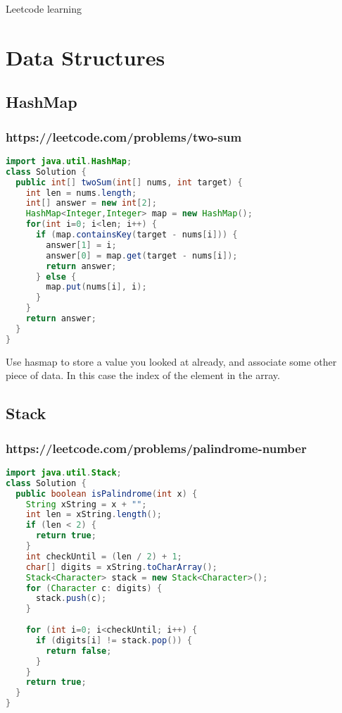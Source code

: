\documentclass[12pt]{article}
\begin{document}

\begin{center}
    \Large Leetcode learning  
\end{center}

\section{Data Structures}

\subsection{HashMap} 

\subsubsection{https://leetcode.com/problems/two-sum}

\begin{lstlisting}[language=Java]
import java.util.HashMap;
class Solution {
  public int[] twoSum(int[] nums, int target) {
    int len = nums.length;
    int[] answer = new int[2];
    HashMap<Integer,Integer> map = new HashMap();
    for(int i=0; i<len; i++) {
      if (map.containsKey(target - nums[i])) {
        answer[1] = i;
        answer[0] = map.get(target - nums[i]);
        return answer;
      } else {
        map.put(nums[i], i);
      }
    }
    return answer;
  }
}
\end{lstlisting}

Use hasmap to store a value you looked at already, and associate some other piece of data. 
In this case the index of the element in the array.

\subsection{Stack} 

\subsubsection{https://leetcode.com/problems/palindrome-number}

\begin{lstlisting}[language=Java]
import java.util.Stack;
class Solution {
  public boolean isPalindrome(int x) {
    String xString = x + "";
    int len = xString.length();
    if (len < 2) {
      return true;
    }
    int checkUntil = (len / 2) + 1;
    char[] digits = xString.toCharArray();
    Stack<Character> stack = new Stack<Character>();
    for (Character c: digits) {
      stack.push(c);
    }
        
    for (int i=0; i<checkUntil; i++) {
      if (digits[i] != stack.pop()) {
        return false;
      }
    }
    return true;
  }
}
\end{lstlisting}
\end{document}
